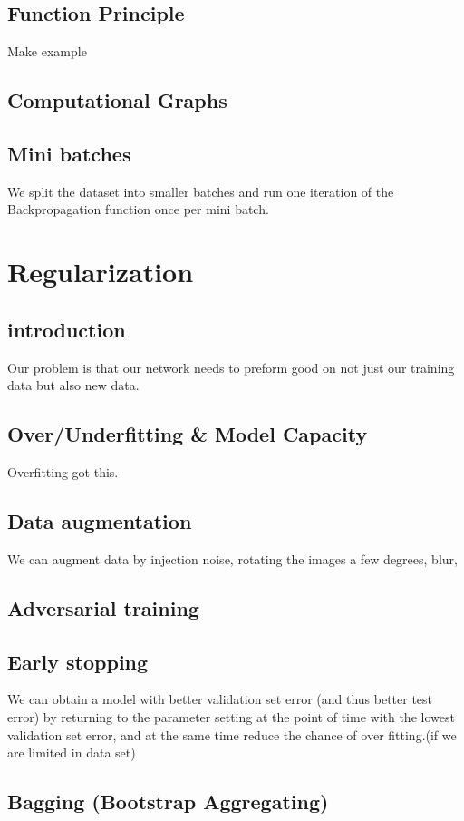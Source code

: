 \documentclass[a4paper,10pt,titlepage]{report}
\begin{document}
\subsection{Function Principle}
Make example
\subsection{Computational Graphs}
\subsection{Mini batches}
We split the dataset into smaller batches and run one iteration of the Backpropagation function once per mini batch.

\newpage
\section{Regularization}
\subsection{introduction}
Our problem is that our network needs to preform good on not just our training data but also new data.
\subsection{Over/Underfitting \& Model Capacity}

	Overfitting got this. 
	
	
\subsection{Data augmentation}
We can augment data by injection noise, rotating the images a few degrees, blur,


\subsection{Adversarial training}


\subsection{Early stopping}
We can obtain a model with better validation set error (and thus
better test error) by returning to the parameter setting at the
point of time with the lowest validation set error, and at the same time reduce the chance of over fitting.(if we are limited in data set)


\subsection{ Bagging (Bootstrap Aggregating)}
\end{document}
